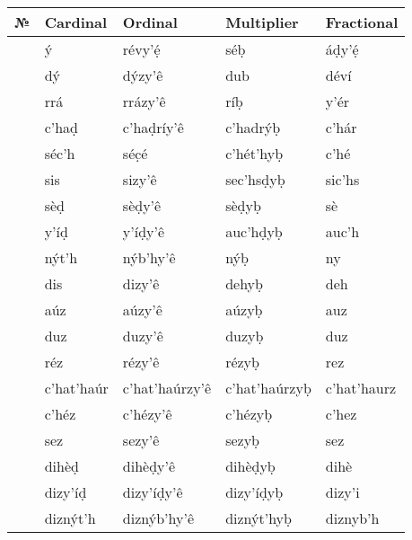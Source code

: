 \documentclass[a4paper, 12pt, twoside, openright, final]{book}
\let \nf \normalfont
\begin{document}
{
\itshape
\begin{longtable}{>{\nf}l|l|l|l|l}
    \nf № & \nf Cardinal & \nf Ordinal & \nf Multiplier & \nf Fractional \\\hline
    1      & ý               & révy’ẹ́             & séḅ               & áḍy’ẹ́           \\
    2      & dý              & dýzy’ê             & dub               & déví            \\
    3      & rrá             & rrázy’ê            & ríḅ               & y’ér            \\
    4      & c’haḍ           & c’haḍríy’ê         & c’hadrýḅ          & c’hár           \\
    5      & séc’h           & séc̣é               & c’hét’hyḅ         & c’hé            \\
    6      & sis             & sizy’ê             & sec’hsḍyḅ         & sic’hs          \\
    7      & sèḍ             & sèḍy’ê             & sèḍyḅ             & sè              \\
    8      & y’íḍ            & y’íḍy’ê            & auc’hḍyḅ          & auc’h           \\
    9      & nýt’h           & nýb’hy’ê           & nýḅ               & ny              \\\hline
    10     & dis             & dizy’ê             & dehyḅ             & deh             \\
    11     & aúz             & aúzy’ê             & aúzyḅ             & auz             \\
    12     & duz             & duzy’ê             & duzyḅ             & duz             \\
    13     & réz             & rézy’ê             & rézyḅ             & rez             \\
    14     & c’hat’haúr      & c’hat’haúrzy’ê     & c’hat’haúrzyḅ     & c’hat’haurz     \\
    15     & c’héz           & c’hézy’ê           & c’hézyḅ           & c’hez           \\
    16     & sez             & sezy’ê             & sezyḅ             & sez             \\
    17     & dihèḍ           & dihèḍy’ê           & dihèḍyḅ           & dihè            \\
    18     & dizy’íḍ         & dizy’íḍy’ê         & dizy’íḍyḅ         & dizy’i          \\
    19     & diznýt’h        & diznýb’hy’ê        & diznýt’hyḅ        & diznyb’h        \\\hline

\end{longtable}}
\end{document}
